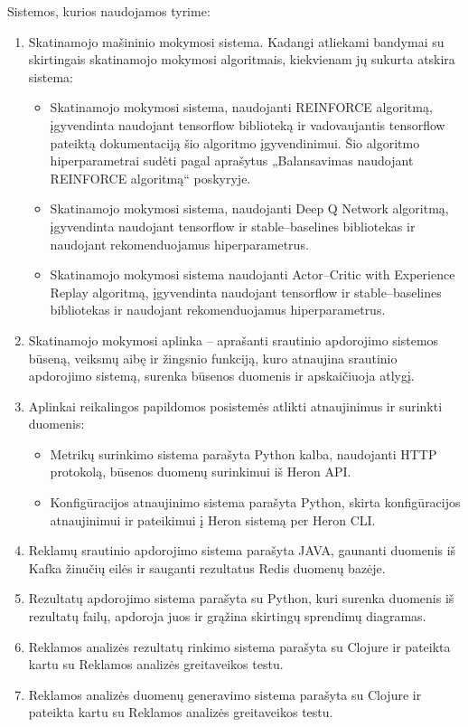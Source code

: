 \documentclass{VUMIFPSbakalaurinis}
\begin{document}
Sistemos, kurios naudojamos tyrime:
\begin{enumerate}
    \item Skatinamojo mašininio mokymosi sistema. Kadangi atliekami bandymai su skirtingais skatinamojo mokymosi algoritmais, kiekvienam jų sukurta atskira sistema: 
    \begin{itemize}
        \item Skatinamojo mokymosi sistema, naudojanti REINFORCE algoritmą, įgyvendinta naudojant tensorflow biblioteką ir vadovaujantis tensorflow pateiktą dokumentaciją šio algoritmo įgyvendinimui. Šio algoritmo hiperparametrai sudėti pagal aprašytus „Balansavimas naudojant REINFORCE algoritmą“ poskyryje.
        \item Skatinamojo mokymosi sistema, naudojanti Deep Q Network algoritmą, įgyvendinta naudojant tensorflow ir stable–baselines bibliotekas ir naudojant rekomenduojamus hiperparametrus.
        \item Skatinamojo mokymosi sistema naudojanti Actor–Critic with Experience Replay algoritmą, įgyvendinta naudojant tensorflow ir stable–baselines bibliotekas ir naudojant rekomenduojamus hiperparametrus.
    \end{itemize}
    \item Skatinamojo mokymosi aplinka – aprašanti srautinio apdorojimo sistemos būseną, veiksmų aibę ir žingsnio funkciją, kuro atnaujina srautinio apdorojimo sistemą, surenka būsenos duomenis ir apskaičiuoja atlygį. 
    \item Aplinkai reikalingos papildomos posistemės atlikti atnaujinimus ir surinkti duomenis:
    \begin{itemize}
        \item Metrikų surinkimo sistema parašyta Python kalba, naudojanti HTTP protokolą, būsenos duomenų surinkimui iš Heron API.
        \item Konfigūracijos atnaujinimo sistema parašyta Python, skirta konfigūracijos atnaujinimui ir pateikimui į Heron sistemą per Heron CLI.
    \end{itemize}
    \item Reklamų srautinio apdorojimo sistema parašyta JAVA, gaunanti duomenis iš Kafka žinučių eilės ir sauganti rezultatus Redis duomenų bazėje.
    \item Rezultatų apdorojimo sistema parašyta su Python, kuri surenka duomenis iš rezultatų failų, apdoroja juos ir grąžina skirtingų sprendimų diagramas.
    \item Reklamos analizės rezultatų rinkimo sistema parašyta su Clojure ir pateikta kartu su Reklamos analizės greitaveikos testu.
    \item Reklamos analizės duomenų generavimo sistema parašyta su Clojure ir pateikta kartu su Reklamos analizės greitaveikos testu.
\end{enumerate}
\end{document}
